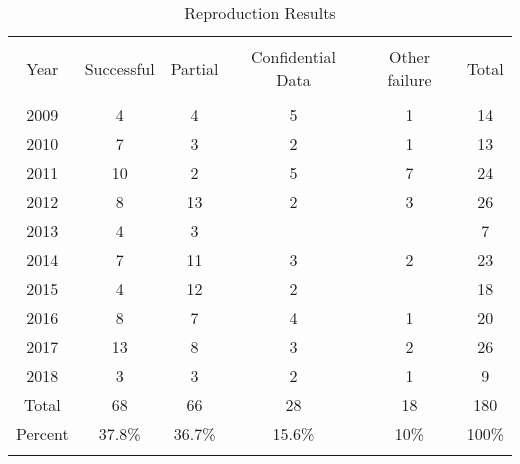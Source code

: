 
\begin{table}[!htbp] \centering 
  \caption{Reproduction Results} 
  \label{tab:results:year} 
\begin{tabular}{@{\extracolsep{0.4pt}} cccccc} 
\\[-1.8ex]\hline 
\hline \\[-1.8ex] 
Year & Successful & Partial & Confidential Data & Other failure & Total \\ 
\hline \\[-1.8ex] 
2009 & 4 & 4 & 5 & 1 & 14 \\ 
2010 & 7 & 3 & 2 & 1 & 13 \\ 
2011 & 10 & 2 & 5 & 7 & 24 \\ 
2012 & 8 & 13 & 2 & 3 & 26 \\ 
2013 & 4 & 3 &  &  & 7 \\ 
2014 & 7 & 11 & 3 & 2 & 23 \\ 
2015 & 4 & 12 & 2 &  & 18 \\ 
2016 & 8 & 7 & 4 & 1 & 20 \\ 
2017 & 13 & 8 & 3 & 2 & 26 \\ 
2018 & 3 & 3 & 2 & 1 & 9 \\ 
Total & 68 & 66 & 28 & 18 & 180 \\ 
Percent & 37.8\% & 36.7\% & 15.6\% & 10\% & 100\% \\ 
\hline \\[-1.8ex] 
\end{tabular} 
\end{table} 

